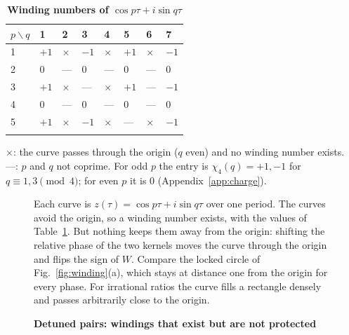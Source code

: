 \documentclass[%
 reprint, amsmath,amssymb, aps, prb, ]{revtex4-2}
\numberwithin{equation}{section}
\begin{document}
\begin{table}[t!]
\centering
\caption{\textbf{Winding numbers of $\cos p\tau+i\sin q\tau$}}
\label{tab:wind}
\renewcommand{\arraystretch}{1.3}
\begin{tabular}{p{2.2cm}p{1.6cm}p{1.6cm}p{1.6cm}p{1.6cm}p{1.6cm}p{1.6cm}p{1.6cm}}
\toprule
$p\backslash q$ & 1 & 2 & 3 & 4 & 5 & 6 & 7 \\
\midrule
1 & $+1$ & $\times$ & $-1$ & $\times$ & $+1$ & $\times$ & $-1$ \\
2 & $0$ & --- & $0$ & --- & $0$ & --- & $0$ \\
3 & $+1$ & $\times$ & --- & $\times$ & $+1$ & --- & $-1$ \\
4 & $0$ & --- & $0$ & --- & $0$ & --- & $0$ \\
5 & $+1$ & $\times$ & $-1$ & $\times$ & --- & $\times$ & $-1$ \\
\addlinespace[0.1cm]
\bottomrule
\end{tabular}
\vspace{0.2cm}
\begin{minipage}{0.95\textwidth}
\justifying\footnotesize
$\times$: the curve passes through the origin ($q$ even) and no winding number exists. ---: $p$ and $q$ not coprime. For odd $p$ the entry is $\chi_4(q)=+1,-1$ for $q\equiv1,3\pmod4$; for even $p$ it is $0$ (Appendix~\ref{app:charge}).
\end{minipage}
\end{table}

\begin{figure}[t!]
\centering
{}
\caption{\textbf{Detuned pairs: windings that exist but are not protected}}
\label{fig:liss}
\vspace{0.4em}
\begin{minipage}{0.95\textwidth}
\justifying\small
Each curve is $z(\tau)=\cos p\tau+i\sin q\tau$ over one period. The curves avoid the origin, so a winding number exists, with the values of Table~\ref{tab:wind}. But nothing keeps them away from the origin: shifting the relative phase of the two kernels moves the curve through the origin and flips the sign of $W$. Compare the locked circle of Fig.~\ref{fig:winding}(a), which stays at distance one from the origin for every phase. For irrational ratios the curve fills a rectangle densely and passes arbitrarily close to the origin.
\end{minipage}
\end{figure}
\end{document}
